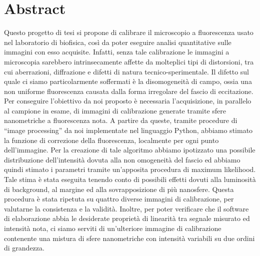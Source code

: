 \clearpage{\pagestyle{empty}\cleardoublepage}

\chapter*{Abstract}

Questo progetto di tesi si propone di calibrare il microscopio a fluorescenza usato nel laboratorio di biofisica, così da poter eseguire analisi quantitative sulle immagini con esso acquisite. 
Infatti, senza tale calibrazione le immagini a microscopia sarebbero intrinsecamente affette da molteplici tipi di distorsioni, tra cui aberrazioni, diffrazione e difetti di natura tecnico-sperimentale. 
Il difetto sul quale ci siamo particolarmente soffermati è la disomogeneità di campo, ossia una non uniforme fluorescenza causata dalla forma irregolare del fascio di eccitazione.
Per conseguire l'obiettivo da noi proposto è necessaria l'acquisizione, in parallelo al campione in esame, di immagini di calibrazione generate tramite sfere nanometriche a fluorescenza nota.
A partire da queste, tramite procedure di ``image processing'' da noi implementate nel linguaggio Python, abbiamo stimato la funzione di correzione della fluorescenza, localmente per ogni punto dell'immagine.
Per la creazione di tale algoritmo abbiamo ipotizzato una possibile distribuzione dell'intensità dovuta alla non omogeneità del fascio ed abbiamo quindi stimato i parametri tramite un'apposita procedura di maximum likelihood.
Tale stima è stata eseguita tenendo conto di possibili effetti dovuti alla luminosità di background, al margine ed alla sovrapposizione di più nanosfere.
Questa procedura è stata ripetuta su quattro diverse immagini di calibrazione, per valutarne la consistenza e la validità.
Inoltre, per poter verificare che il software di elaborazione abbia le desiderate proprietà di linearità tra segnale misurato ed intensità nota, ci siamo serviti di un'ulteriore immagine di calibrazione contenente una mistura di sfere nanometriche con intensità variabili su due ordini di grandezza.
